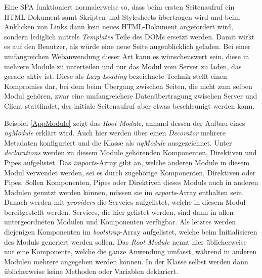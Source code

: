 Eine \acl{SPA} funktioniert normalerweise so, dass beim ersten Seitenaufruf ein HTML-Dokument samt Skripten und Stylesheets übertragen wird und beim Anklicken von Links dann kein neues HTML-Dokument angefordert wird, sondern lediglich mittels \textit{Templates} Teile des \acsp{DOM} ersetzt werden. Damit wirkt es auf den Benutzer, als würde eine neue Seite augenblicklich geladen. Bei einer umfangreichen Webanwendung dieser Art kann es wünschenswert sein, diese in mehrere Module zu unterteilen und nur das Modul vom Server zu laden, das gerade aktiv ist. Diese als \textit{Lazy Loading} bezeichnete Technik stellt einen Kompromiss dar, bei dem beim Übergang zwischen Seiten, die nicht zum selben Modul gehören, zwar eine umfangreichere Datenübertragung zwischen Server und Client stattfindet, der initiale Seitenaufruf aber etwas beschleunigt werden kann.

Beispiel \ref{AppModule} zeigt das \textit{Root Module}, anhand dessen der Aufbau eines \textit{ngModule} erklärt wird. Auch hier werden über einen \textit{Decorator} mehrere Metadaten konfiguriert und die Klasse als \textit{ngModule} ausgezeichnet. Unter \textit{declarations} werden zu diesem Module gehörenden Komponenten, Direktiven und Pipes aufgelistet. Das \textit{imports}-Array gibt an, welche anderen Module in diesem Modul verwendet werden, sei es durch zugehörige Komponenten, Direktiven oder Pipes. Sollen Komponenten, Pipes oder Direktiven dieses Moduls auch in anderen Modulen genutzt werden können, müssen sie im \textit{exports}-Array enthalten sein. Danach werden mit \textit{providers} die Servcies aufgelistet, welche in diesem Modul bereitgestellt  werden. Services, die hier gelistet werden, sind dann in allen untergeordneten Modulen und Komponenten verfügbar. Als letztes werden diejenigen Komponenten im \textit{bootstrap}-Array aufgelistet, welche beim Initialisieren des Moduls generiert werden sollen. Das \textit{Root Module} nennt hier üblicherweise nur eine Komponente, welche die ganze Anwendung umfasst, während in anderen Modulen mehrere angegeben werden können. In der Klasse selbst werden dann üblicherweise keine Methoden oder Variablen deklariert\cite{AngularModule}.

